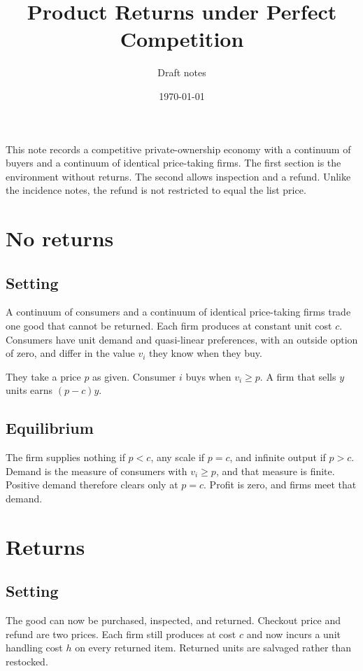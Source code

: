 \documentclass[11pt]{article}
\title{Product Returns under Perfect Competition}
\author{Draft notes}
\date{\today}
\begin{document}
\maketitle

This note records a competitive private-ownership economy with a continuum
of buyers and a continuum of identical price-taking firms. The first section
is the environment without returns. The second allows inspection and a refund.
Unlike the incidence notes, the refund is not restricted to equal the list
price.

\section{No returns}

\subsection{Setting}

A continuum of consumers and a continuum of identical price-taking firms
trade one good that cannot be returned. Each firm produces at constant unit
cost $c$. Consumers have unit demand and quasi-linear preferences, with an
outside option of zero, and differ in the value $v_i$ they know when they
buy.

They take a price $p$ as given. Consumer $i$ buys when $v_i\geq p$. A firm
that sells $y$ units earns $(p-c)y$.

\subsection{Equilibrium}

The firm supplies nothing if $p<c$, any scale if $p=c$, and infinite output
if $p>c$. Demand is the measure of consumers with $v_i\geq p$, and that
measure is finite. Positive demand therefore clears only at $p=c$. Profit
is zero, and firms meet that demand.

\section{Returns}

\subsection{Setting}

The good can now be purchased, inspected, and returned. Checkout price and
refund are two prices. Each firm still produces at cost $c$ and now incurs
a unit handling cost $h$ on every returned item. Returned units are salvaged
rather than restocked.
\end{document}

